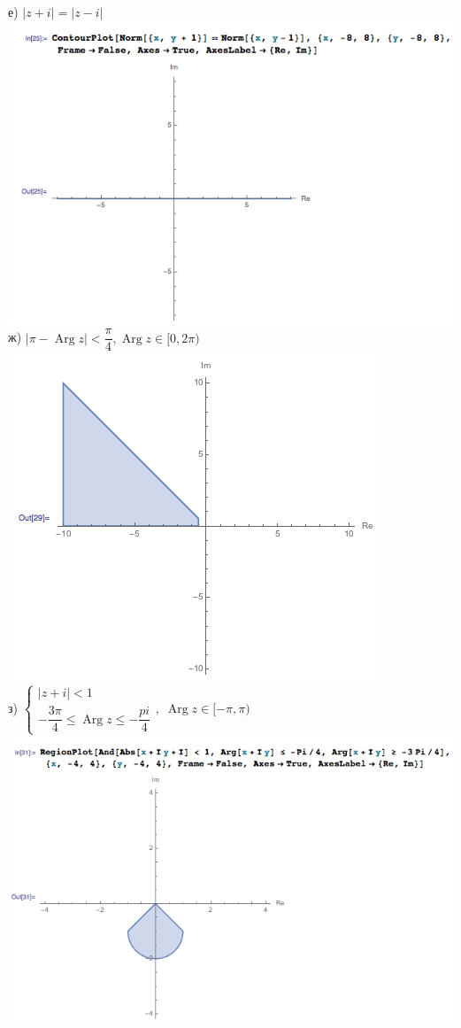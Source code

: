 \\
е)
$ |z+i|=|z-i| $
\\
\includegraphics[scale=0.6]{task/2_10/screen6.png}
\\
ж)
$ |\pi - \operatorname{Arg} z| < \dfrac{\pi}{4}, \operatorname{Arg}z \in [0,2\pi) $
\\
\includegraphics[scale=0.6]{task/2_10/screen7.png}
\\
з)
$
	\begin{cases}
		|z + i| < 1 \\
		-\dfrac{3\pi}{4} \leq \operatorname{Arg} z \leq -\dfrac{pi}{4}
	\end{cases}, \;
	\operatorname{Arg} z \in [-\pi,\pi)
$
\\
\includegraphics[scale=0.6]{task/2_10/screen8.png}
\\
